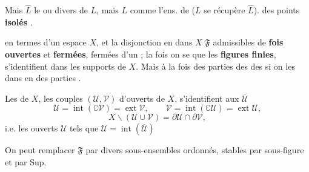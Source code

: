 \documentclass[11pt,a4paper]{article}
\begin{document}
Mais $\widehat{L}$ le  ou divers  de $L$, mais $L$  comme l'ens. de  ($L$ se récupère  $\widehat{L}$).  des points \textbf{isolés} \ill{}.

  en termes d'un espace  $X$, et  \struck{\ill{}} la disjonction en  \ill{} dans $X$  $\mathfrak{F}$  admissibles  de \textbf{fois} \textbf{ouvertes} et \textbf{fermées}, fermées d'un \ill{} ; la fois \ill{}  on se  que les \struck{\ill{}} \textbf{ \struck{\ill{}} figures finies}, \struck{\ill{}}  s'identifient \ill{} dans les supports \ill{} de $X$. Mais \ill{} à la fois \ill{} \ill{} des parties \ill{} des   \ill{} des \ill{} si on  \ill{} les   \ill{} dans \ill{} en \ill{} \textbf{} \struck{\ill{}} des parties   \ill{}.


Les \struck{\ill{}}  \ill{} de $X$, \ill{} les \struck{\ill{}} couples $(\mathcal{U}, \mathcal{V})$ d'ouverts de $X$, s'identifient aux \struck{\ill{}} $\overline{\mathcal{U}}$
\[
  \mathcal{U} = \operatorname{int}(\complement \mathcal{V}) = \operatorname{ext} \mathcal{V} , \qquad \mathcal{V} = \operatorname{int}(\complement \mathcal{U}) = \operatorname{ext} \mathcal{U} ,
\]
\[
  X \smallsetminus (\mathcal{U} \cup \mathcal{V}) = \partial \mathcal{U} \cap \partial \mathcal{V} ,
\]
i.e. les ouverts $\mathcal{U}$ tels que $\mathcal{U} = \operatorname{int}(\overline{\mathcal{U}})$

On peut remplacer $\mathfrak{F}$ par divers sous-ensembles ordonnés, stables par   sous-figure  \struck{\ill{}} et par Sup.
\end{document}
